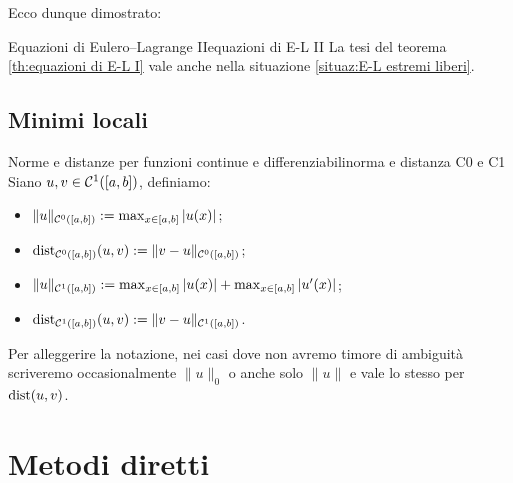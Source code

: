 \documentclass[openany]{book}
\begin{document}
Ecco dunque dimostrato:
\begin{theorem}{Equazioni di Eulero--Lagrange II}{equazioni di E-L II}
    La tesi del teorema \ref{th:equazioni di E-L I} vale anche nella situazione \ref{situaz:E-L estremi liberi}.
\end{theorem}

\section{Minimi locali}

\begin{definition}{Norme e distanze per funzioni continue e differenziabili}{norma e distanza C0 e C1}
    Siano $u,v \in \mathcal{C}^1([a,b])$, definiamo:\begin{itemize}
        \item $\|u\|_{\mathcal{C}^0([a,b])} := \max_{x \in[a,b]} |u(x)|$;
        \item $\operatorname{dist}_{\mathcal{C}^0([a,b])}(u,v) := \| v-u \|_{\mathcal{C}^0([a,b])}$;
        \item $\| u \|_{\mathcal{C}^1([a,b])} := \max_{x \in[a,b]} |u(x)| + \max_{x \in[a,b]} |u'(x)|$;
        \item $\operatorname{dist}_{\mathcal{C}^1([a,b])}(u,v) := \| v-u \|_{\mathcal{C}^1([a,b])}$.
    \end{itemize}
    Per alleggerire la notazione, nei casi dove non avremo timore di ambiguità scriveremo occasionalmente $\|u\|_0$ o anche solo $\|u\|$ e vale lo stesso per $\operatorname{dist}(u,v)$.
\end{definition}

\chapter{Metodi diretti}

\printbibliography[heading=bibintoc]
\end{document}
